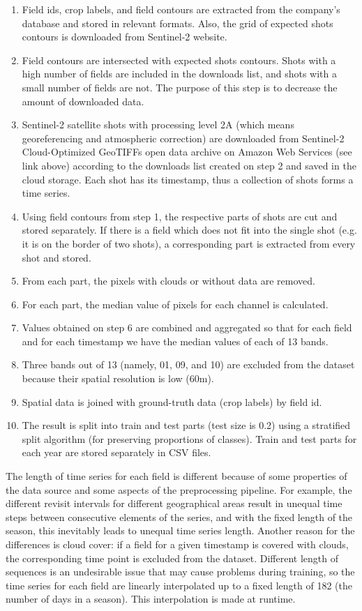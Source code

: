\documentclass{article}
\begin{document}
\begin{enumerate}
    \item Field ids, crop labels, and field contours are extracted from the company's database and stored in relevant formats. Also, the grid of expected shots contours is downloaded from Sentinel-2 website.
    \item Field contours are intersected with expected shots contours. Shots with a high number of fields are included in the downloads list, and shots with a small number of fields are not. The purpose of this step is to decrease the amount of downloaded data.
    \item Sentinel-2 satellite shots with processing level 2A (which means georeferencing and atmospheric correction) are downloaded from Sentinel-2 Cloud-Optimized GeoTIFFs open data archive on Amazon Web Services (see link above) according to the downloads list created on step 2 and saved in the cloud storage. Each shot has its timestamp, thus a collection of shots forms a time series.
    \item Using field contours from step 1, the respective parts of shots are cut and stored separately. If there is a field which does not fit into the single shot (e.g. it is on the border of two shots), a corresponding part is extracted from every shot and stored.
    \item From each part, the pixels with clouds or without data are removed.
    \item For each part, the median value of pixels for each channel is calculated.
    \item Values obtained on step 6 are combined and aggregated so that for each field and for each timestamp we have the median values of each of 13 bands.
    \item Three bands out of 13 (namely, 01, 09, and 10) are excluded from the dataset because their spatial resolution is low (60m).
    \item Spatial data is joined with ground-truth data (crop labels) by field id.
    \item The result is split into train and test parts (test size is 0.2) using a stratified split algorithm (for preserving proportions of classes). Train and test parts for each year are stored separately in CSV files.
\end{enumerate}

The length of time series for each field is different because of some properties of the data source and some aspects of the preprocessing pipeline. For example, the different revisit intervals for different geographical areas result in unequal time steps between consecutive elements of the series, and with the fixed length of the season, this inevitably leads to unequal time series length. Another reason for the differences is cloud cover: if a field for a given timestamp is covered with clouds, the corresponding time point is excluded from the dataset. Different length of sequences is an undesirable issue that may cause problems during training, so the time series for each field are linearly interpolated up to a fixed length of 182 (the number of days in a season). This interpolation is made at runtime.
\end{document}
